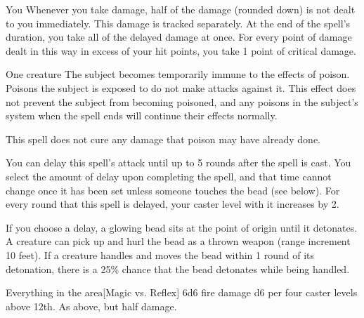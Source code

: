 \spelldur{\durmed}
\begin{spelltarget}{You}
    \spelleffect Whenever you take damage, half of the damage (rounded down) is not dealt to you immediately. This damage is tracked separately. At the end of the spell's duration, you take all of the delayed damage at once. For every point of damage dealt in this way in excess of your hit points, you take 1 point of critical damage.
\end{spelltarget}

\spellrng{\rngclose}
\spelldur{\durshort}
\begin{spelltarget}{One creature}
    \spelleffect The subject becomes temporarily immune to the effects of poison. Poisons the subject is exposed to do not make attacks against it. This effect does not prevent the subject from becoming poisoned, and any poisons in the subject's system when the spell ends will continue their effects normally. 
\end{spelltarget}
\spellnotes This spell does not cure any damage that poison may have already done.

\spellline
\spelleffect You can delay this spell's attack until up to 5 rounds after the spell is cast. You select the amount of delay upon completing the spell, and that time cannot change once it has been set unless someone touches the bead (see below). For every round that this spell is delayed, your caster level with it increases by 2.

If you choose a delay, a glowing bead sits at the point of origin until it detonates. A creature can pick up and hurl the bead as a thrown weapon (range increment 10 feet). If a creature handles and moves the bead within 1 round of its detonation, there is a 25\% chance that the bead detonates while being handled.
\begin{spelltargets}{Everything in the area}[Magic vs. Reflex]
    \spellsuccess 6d6 fire damage \add d6 per four caster levels above 12th.
    \spellfailure As above, but half damage.
\end{spelltargets}

